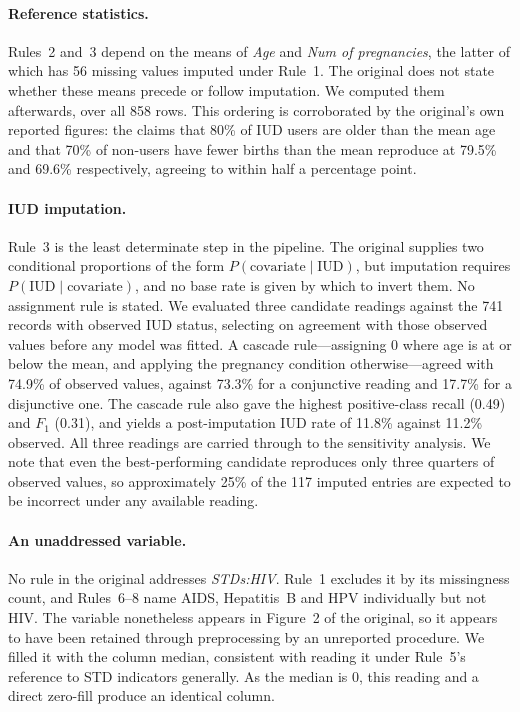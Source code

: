 \paragraph{Reference statistics.} Rules~2 and~3 depend on the means of
\emph{Age} and \emph{Num of pregnancies}, the latter of which has 56 missing
values imputed under Rule~1. The original does not state whether these means
precede or follow imputation. We computed them afterwards, over all 858 rows.
This ordering is corroborated by the original's own reported figures: the
claims that 80\% of IUD users are older than the mean age and that 70\% of
non-users have fewer births than the mean reproduce at 79.5\% and 69.6\%
respectively, agreeing to within half a percentage point.

\paragraph{IUD imputation.} Rule~3 is the least determinate step in the
pipeline. The original supplies two conditional proportions of the form
$P(\text{covariate} \mid \text{IUD})$, but imputation requires
$P(\text{IUD} \mid \text{covariate})$, and no base rate is given by which to
invert them. No assignment rule is stated. We evaluated three candidate
readings against the 741 records with observed IUD status, selecting on
agreement with those observed values before any model was fitted. A cascade
rule---assigning $0$ where age is at or below the mean, and applying the
pregnancy condition otherwise---agreed with 74.9\% of observed values, against
73.3\% for a conjunctive reading and 17.7\% for a disjunctive one. The cascade
rule also gave the highest positive-class recall (0.49) and $F_1$ (0.31), and
yields a post-imputation IUD rate of 11.8\% against 11.2\% observed. All three
readings are carried through to the sensitivity analysis. We note that even the
best-performing candidate reproduces only three quarters of observed values, so
approximately 25\% of the 117 imputed entries are expected to be incorrect
under any available reading.

\paragraph{An unaddressed variable.} No rule in the original addresses
\emph{STDs:HIV}. Rule~1 excludes it by its missingness count, and Rules~6--8
name AIDS, Hepatitis~B and HPV individually but not HIV. The variable
nonetheless appears in Figure~2 of the original, so it appears to have been
retained through preprocessing by an unreported procedure. We filled it with
the column median, consistent with reading it under Rule~5's reference to STD
indicators generally. As the median is $0$, this reading and a direct zero-fill
produce an identical column.

